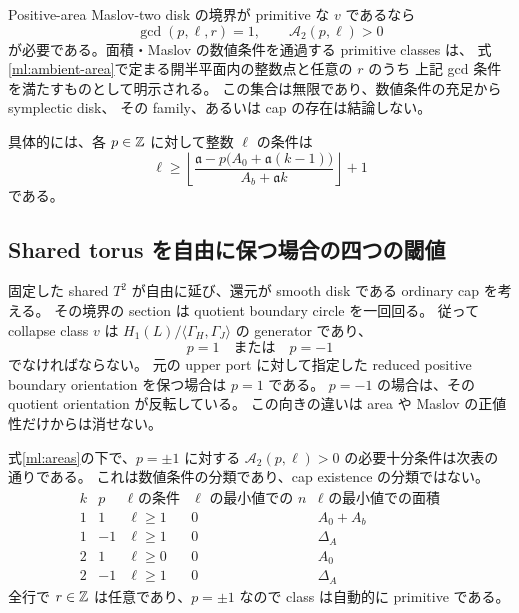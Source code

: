 \begin{corollary}
\label{ml:half-plane}
Positive-area Maslov-two disk の境界が primitive な $v$ であるなら
\[
 \gcd(p,\ell,r)=1,\qquad \mathcal A_2(p,\ell)>0
\]
が必要である。面積・Maslov の数値条件を通過する primitive classes は、
式\eqref{ml:ambient-area}で定まる開半平面内の整数点と任意の $r$ のうち
上記 gcd 条件を満たすものとして明示される。
この集合は無限であり、数値条件の充足から symplectic disk、
その family、あるいは cap の存在は結論しない。
\end{corollary}

具体的には、各 $p\in\mathbb Z$ に対して整数 $\ell$ の条件は
\[
 \ell\ge
 \left\lfloor
 \frac{\mathfrak a-p\bigl(A_0+\mathfrak a(k-1)\bigr)}
      {A_b+\mathfrak a k}
 \right\rfloor+1
\]
である。

\subsection{Shared torus を自由に保つ場合の四つの閾値}

固定した shared $T^2$ が自由に延び、還元が smooth disk である ordinary cap を考える。
その境界の section は quotient boundary circle を一回回る。
従って collapse class $v$ は $H_1(L)/\langle\Gamma_H,\Gamma_J\rangle$ の generator であり、
\begin{equation}\label{ml:unimodular}
 p=1\quad\text{または}\quad p=-1
\end{equation}
でなければならない。
元の upper port に対して指定した reduced positive boundary orientation を保つ場合は $p=1$ である。
$p=-1$ の場合は、その quotient orientation が反転している。
この向きの違いは area や Maslov の正値性だけからは消せない。

\begin{proposition}
\label{ml:thresholds}
式\eqref{ml:areas}の下で、$p=\pm1$ に対する
$\mathcal A_2(p,\ell)>0$ の必要十分条件は次表の通りである。
これは数値条件の分類であり、cap existence の分類ではない。
\[
\begin{array}{c|c|c|c|c}
 k&p&\ell\text{ の条件}&\ell\text{ の最小値での }n
   &\ell\text{ の最小値での面積}\\\hline
 1& 1&\ell\ge1&0&A_0+A_b\\
 1&-1&\ell\ge1&0&\Delta_A\\
 2& 1&\ell\ge0&0&A_0\\
 2&-1&\ell\ge1&0&\Delta_A
\end{array}
\]
全行で $r\in\mathbb Z$ は任意であり、$p=\pm1$ なので class は自動的に primitive である。
\end{proposition}

